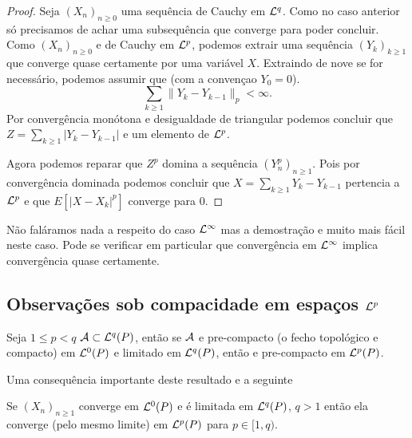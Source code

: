 \begin{topics}
 \begin{proof}
 Seja $(X_n)_{n\ge 0}$ uma sequência de Cauchy em ${\mathcal L}^q$.
  Como no caso anterior só precisamos de achar uma subsequência que converge para poder concluir.
 Como $(X_n)_{n\ge 0}$ e de Cauchy em ${\mathcal L}^p$, podemos extrair uma sequência $(Y_k)_{k\ge 1}$ que converge quase certamente por uma variável $X$.
 Extraindo de nove se for necessário, podemos assumir que  (com a convençao $Y_0=0$).
   $$\sum_{k\ge 1} \| Y_k-Y_{k-1} \|_{p}<\infty.$$
    Por convergência monótona e desigualdade de triangular podemos concluir que
 $Z=\sum_{k\ge 1} |Y_k-Y_{k-1}|$ e um elemento de ${\mathcal L}^p$.

 \medskip

 Agora podemos reparar que $Z^p$ domina a sequência $(Y^p_n)_{n\ge 1}$.
 Pois por convergência dominada podemos concluir que  $X=\sum_{k\ge 1} Y_k-Y_{k-1}$ pertencia a ${\mathcal L}^p$ e que $E[|X-X_k|^p]$ converge para $0$.
 \end{proof}

 \begin{remark}
  Não faláramos nada a respeito do caso ${\mathcal L}^{\infty}$  mas a demostração e muito mais fácil neste caso.
  Pode se verificar em particular que convergência em ${\mathcal L}^{\infty}$ implica convergência quase certamente.
 \end{remark}


\subsection{Observações sob compacidade em espaços ${\mathcal L}^p$}

\begin{proposition}\label{prop:laug}
 Seja $1 \le p<q$  ${\mathcal A}\subset {\ensuremath{\mathcal L}}^q(P)$, então se ${\mathcal A}$ e pre-compacto (o fecho topológico e compacto) em ${\mathcal L}^0(P)$ e
 limitado em ${\mathcal L}^q(P)$, então e pre-compacto em ${\mathcal L}^p(P)$.
 \end{proposition}
Uma consequência importante deste resultado e a seguinte
\begin{corollary}
 Se $(X_n)_{n\ge 1}$ converge em ${\mathcal L}^0(P)$ e é limitada em ${\mathcal L}^q(P)$, $q>1$ então
ela converge (pelo mesmo limite) em ${\mathcal L}^p(P)$ para $p\in [1,q)$.
 \end{corollary}



\end{topics}
